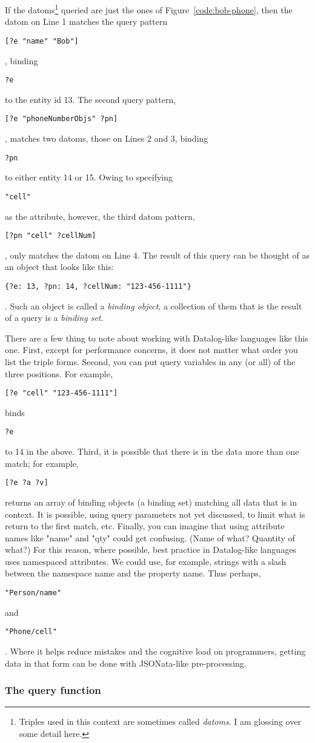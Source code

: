 \documentclass[9pt,letterpaper]{article}
\newcommand{\stt}[1]{\begin{footnotesize}\texttt{#1}\end{footnotesize}}
\begin{document}
If the datoms\footnote{Triples used in this context are sometimes called \textit{datoms}. I am glossing over some detail here.} queried are just the ones of
Figure~\ref{code:bob-phone}, then the datom on Line 1 matches the query pattern \stt{[?e "name" "Bob"]}, binding \stt{?e} to the entity id 13.
The second query pattern, \stt{[?e "phoneNumberObjs" ?pn]}, matches two datoms, those on Lines 2 and 3, binding \stt{?pn} to either entity 14 or 15.
Owing to specifying \stt{"cell"} as the attribute, however, the third datom pattern, \stt{[?pn "cell" ?cellNum]}, only matches the datom on Line 4.
The result of this query can be thought of as an object that looks like this: \stt{\{?e: 13, ?pn: 14, ?cellNum: "123-456-1111"\}}.
Such an object is called a \textit{binding object}, a collection of them that is the result of a query is a \textit{binding set}.

There are a few thing to note about working with Datalog-like languages like this one.
First, except for performance concerns, it does not matter what order you list the triple forms.
Second, you can put query variables in any (or all) of the three positions.
For example, \stt{[?e "cell" "123-456-1111"]} binds \stt{?e} to 14 in the above.
Third, it is possible that there is in the data more than one match;
for example, \stt{[?e ?a ?v]} returns an array of binding objects (a binding set) matching all data that is in context.
It is possible, using query parameters not yet discussed, to limit what is return to the first match, etc.
Finally, you can imagine that using attribute names like "name" and "qty" could get confusing. (Name of what? Quantity of what?)
For this reason, where possible, best practice in Datalog-like languages uses namespaced attributes.
We could use, for example, strings with a slash between the namespace name and the property name. Thus perhaps, \stt{"Person/name"} and \stt{"Phone/cell"}.
Where it helps reduce mistakes and the cognitive load on programmers, getting data in that form can be done with JSONata-like pre-processing.

\subsubsection{The query function}
\end{document}

